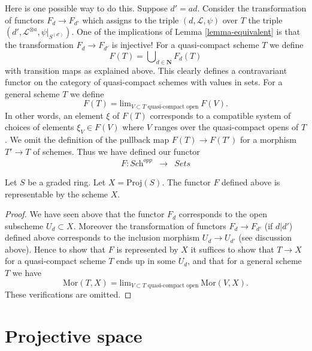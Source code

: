 \medskip\noindent
Here is one possible way to do this. Suppose $d' = ad$.
Consider the transformation of functors $F_d \to F_{d'}$
which assigns to the triple $(d, \mathcal{L}, \psi)$ over
$T$ the triple $(d', \mathcal{L}^{\otimes a}, \psi|_{S^{(d')}})$.
One of the implications of Lemma \ref{lemma-equivalent} is that the
transformation $F_d \to F_{d'}$ is injective!
For a quasi-compact scheme $T$ we define
$$
F(T) = \bigcup\nolimits_{d \in \mathbf{N}} F_d(T)
$$
with transition maps as explained above. This clearly defines a
contravariant functor on the category of quasi-compact schemes
with values in sets. For a general scheme
$T$ we define
$$
F(T)
=
\text{lim}_{V \subset T\text{ quasi-compact open}}\ F(V).
$$
In other words, an element $\xi$ of $F(T)$ corresponds to a compatible system
of choices of elements $\xi_V \in F(V)$ where $V$ ranges over the
quasi-compact opens of $T$.
We omit the definition of the pullback map $F(T) \to F(T')$
for a morphism $T' \to T$ of schemes.
Thus we have defined our functor
\begin{eqnarray*}
F : \textit{Sch}^{opp} & \longrightarrow & \textit{Sets}
\end{eqnarray*}

\begin{lemma}
\label{lemma-proj-functor}
Let $S$ be a graded ring.
Let $X = \text{Proj}(S)$.
The functor $F$ defined above is representable by the scheme $X$.
\end{lemma}

\begin{proof}
We have seen above that the functor $F_d$ corresponds to the
open subscheme $U_d \subset X$. Moreover the transformation
of functors $F_d \to F_{d'}$ (if $d | d'$) defined above
corresponds to the inclusion morphism $U_d \to U_{d'}$
(see discussion above). Hence to show that $F$ is represented
by $X$ it suffices to show that $T \to X$ for a quasi-compact
scheme $T$ ends up in some $U_d$, and that for a general scheme
$T$ we have
$$
\text{Mor}(T, X)
=
\text{lim}_{V \subset T\text{ quasi-compact open}}\ \text{Mor}(V, X).
$$
These verifications are omitted.
\end{proof}







\section{Projective space}
\label{section-projective-space}

